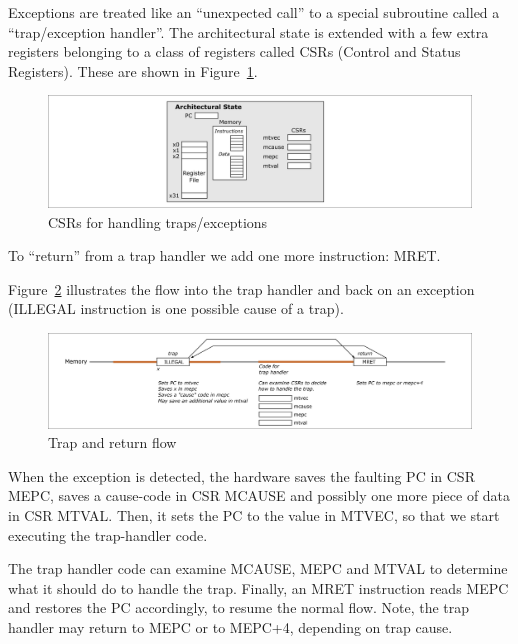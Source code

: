 Exceptions are treated like an ``unexpected call'' to a special
subroutine called a ``trap/exception handler''.  The architectural
state is extended with a few extra registers belonging to a class of
registers called CSRs (Control and Status Registers).  These are shown
in Figure~\ref{Fig_Trap_CSRs}.
\begin{figure}[htbp]
  \centerline{\includegraphics[width=6in,angle=0]{Figures/Fig_Trap_CSRs}}
  \caption{\label{Fig_Trap_CSRs} CSRs for handling traps/exceptions}
\end{figure}

To ``return'' from a trap handler we add one more instruction: MRET.

Figure~\ref{Fig_Trap_Return} illustrates the flow into the trap
handler and back on an exception (ILLEGAL instruction is one possible
cause of a trap).
\begin{figure}[htbp]
  \centerline{\includegraphics[width=6in,angle=0]{Figures/Fig_Trap_Return}}
  \caption{\label{Fig_Trap_Return} Trap and return flow}
\end{figure}

When the exception is detected, the hardware saves the faulting PC in
CSR MEPC, saves a cause-code in CSR MCAUSE and possibly one more piece
of data in CSR MTVAL.  Then, it sets the PC to the value in MTVEC, so
that we start executing the trap-handler code.

The trap handler code can examine MCAUSE, MEPC and MTVAL to determine
what it should do to handle the trap.  Finally, an MRET instruction
reads MEPC and restores the PC accordingly, to resume the normal flow.
Note, the trap handler may return to MEPC or to MEPC+4, depending on
trap cause.


